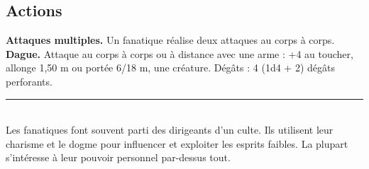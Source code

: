 \begin{figure*}[hbp]
{\begin{minipage}[c]{.45\linewidth}
    \subsection*{Actions}
    {\bfseries Attaques multiples.} Un fanatique réalise deux attaques au corps à corps. \\
    {\bfseries Dague.} Attaque au corps à corps ou à distance avec une arme : +4 au toucher, allonge 1,50 m ou portée 6/18 m, une créature. Dégâts : 4 (1d4 + 2) dégâts perforants. \\
    \noindent\rule{\textwidth}{1pt} \\
Les fanatiques font souvent parti des dirigeants d'un culte. Ils utilisent leur charisme et le dogme pour influencer et exploiter les esprits faibles. La plupart s'intéresse à leur pouvoir personnel par-dessus tout.
  \end{minipage}
}%
\end{figure*}

